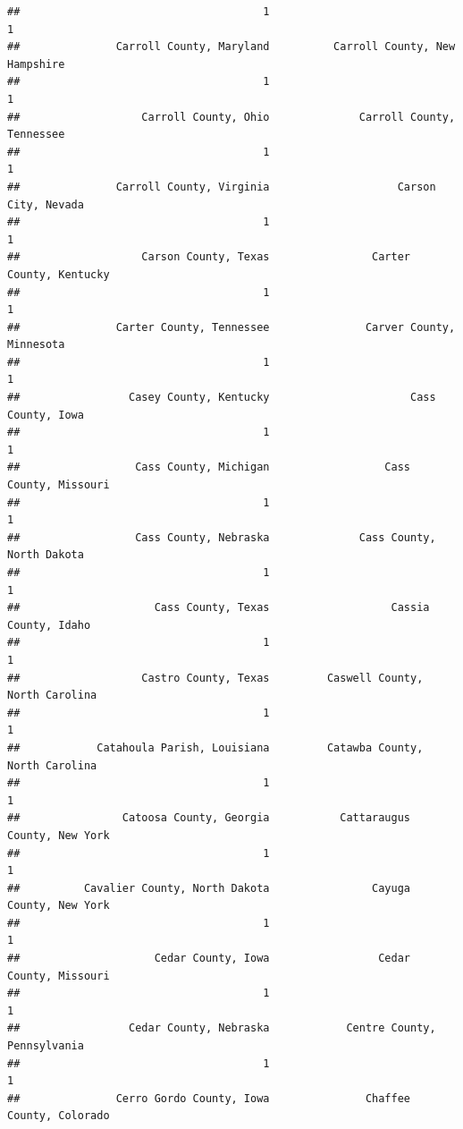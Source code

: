 \documentclass[
]{article}
\begin{document}
\begin{verbatim}
##                                      1                                      1 
##               Carroll County, Maryland          Carroll County, New Hampshire 
##                                      1                                      1 
##                   Carroll County, Ohio              Carroll County, Tennessee 
##                                      1                                      1 
##               Carroll County, Virginia                    Carson City, Nevada 
##                                      1                                      1 
##                   Carson County, Texas                Carter County, Kentucky 
##                                      1                                      1 
##               Carter County, Tennessee               Carver County, Minnesota 
##                                      1                                      1 
##                 Casey County, Kentucky                      Cass County, Iowa 
##                                      1                                      1 
##                  Cass County, Michigan                  Cass County, Missouri 
##                                      1                                      1 
##                  Cass County, Nebraska              Cass County, North Dakota 
##                                      1                                      1 
##                     Cass County, Texas                   Cassia County, Idaho 
##                                      1                                      1 
##                   Castro County, Texas         Caswell County, North Carolina 
##                                      1                                      1 
##            Catahoula Parish, Louisiana         Catawba County, North Carolina 
##                                      1                                      1 
##                Catoosa County, Georgia           Cattaraugus County, New York 
##                                      1                                      1 
##          Cavalier County, North Dakota                Cayuga County, New York 
##                                      1                                      1 
##                     Cedar County, Iowa                 Cedar County, Missouri 
##                                      1                                      1 
##                 Cedar County, Nebraska            Centre County, Pennsylvania 
##                                      1                                      1 
##               Cerro Gordo County, Iowa               Chaffee County, Colorado 

\end{verbatim}
\end{document}
